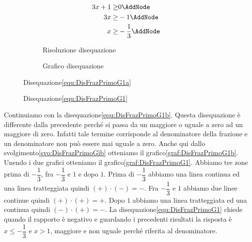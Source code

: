 \begin{figure}
	\centering
	\begin{subfigure}[]{\linewidth}
		\begin{NodesList}
			\centering
			\begin{align*}
				3x+1\geq& 0\AddNode\\
				3x\geq&-1\AddNode\\
				x\geq&-\dfrac{1}{3}\AddNode
			\end{align*}
			\LinkNodes[margin=6cm]{}%
			\LinkNodes[margin=6cm]{}%
		\end{NodesList}
		\caption{Risoluzione disequazione}
		\label{svo:DisFrazPrimoG1a}
	\end{subfigure}%
	\qquad
	\begin{subfigure}[]{\linewidth}
		\centering
		\caption{Grafico disequazione}
		\label{graf:DisFrazPrimoG1a}
	\end{subfigure}%
	\captionsetup{format=esempio,list=no}
	\caption{Disequazione\nobs\vref{equ:DisFrazPrimoG1a}}
	\label{esempio:DisFrazPrimoG1a}
\end{figure}
     \begin{figure}
	\centering
	\captionsetup{format=esempio,list=no}
	\caption{Disequazione\nobs\vref{equ:DisFrazPrimoG1}}
	\label{graf:DisFrazPrimoG1}
\end{figure}
Continuiamo con la disequazione\nobs\vref{equ:DisFrazPrimoG1b}.
Questa disequazione è differente dalla precedente perché si passa da un maggiore o uguale a zero ad un maggiore di zero. Infatti tale termine corrisponde al denominatore della frazione e un denominatore non può essere mai uguale a zero. Anche 
qui dallo svolgimento\nobs\vref{svo:DisFrazPrimoGìb} otteniamo il grafico\nobs\vref{graf:DisFrazPrimoG1b}. Unendo i due grafici otteniamo il grafico\nobs\vref{graf:DisFrazPrimoG1}. Abbiamo tre zone prima di $-\dfrac{1}{3}$, fra $-\dfrac{1}{3}$ e $1$  e dopo $1$. Prima di $-\dfrac{1}{3}$ abbiamo una linea continua ed una linea tratteggiata quindi $(+)\cdot(-)=-$. Fra $-\dfrac{1}{3}$ e $1$ abbiamo due linee continue quindi $(+)\cdot(+)=+$. Dopo $1$ abbiamo una linea tratteggiata ed una continua quindi $(-)\cdot(+)=-$. La disequazione\nobs\vref{equ:DisFrazPrimoG1} chiede quando il rapporto è negativo e guardando i precedenti risultati la risposta è $x\leq -\dfrac{1}{3}$ e $x>1$, maggiore e non uguale perché riferita al denominatore.  

